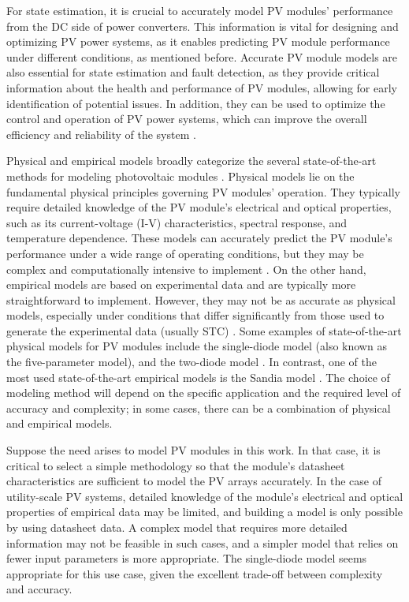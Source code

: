 For state estimation, it is crucial to accurately model PV modules' performance from the DC side of power converters. This information is vital for designing and optimizing PV power systems, as it enables predicting PV module performance under different conditions, as mentioned before. Accurate PV module models are also essential for state estimation and fault detection, as they provide critical information about the health and performance of PV modules, allowing for early identification of potential issues. In addition, they can be used to optimize the control and operation of PV power systems, which can improve the overall efficiency and reliability of the system \cite{Braun2011}.

Physical and empirical models broadly categorize the several state-of-the-art methods for modeling photovoltaic modules \cite{Braun2011}. Physical models lie on the fundamental physical principles governing PV modules' operation. They typically require detailed knowledge of the PV module's electrical and optical properties, such as its current-voltage (I-V) characteristics, spectral response, and temperature dependence. These models can accurately predict the PV module's performance under a wide range of operating conditions, but they may be complex and computationally intensive to implement \cite{Kumar2019}. On the other hand, empirical models are based on experimental data and are typically more straightforward to implement. However, they may not be as accurate as physical models, especially under conditions that differ significantly from those used to generate the experimental data (usually STC) \cite{Braun2011}. Some examples of state-of-the-art physical models for PV modules include the single-diode model (also known as the five-parameter model), and the two-diode model \cite{Godina2017}. In contrast, one of the most used state-of-the-art empirical models is the Sandia model \cite{Braun2011}. The choice of modeling method will depend on the specific application and the required level of accuracy and complexity; in some cases, there can be a combination of physical and empirical models.

Suppose the need arises to model PV modules in this work. In that case, it is critical to select a simple methodology so that the module's datasheet characteristics are sufficient to model the PV arrays accurately. In the case of utility-scale PV systems, detailed knowledge of the module's electrical and optical properties of empirical data may be limited, and building a model is only possible by using datasheet data. A complex model that requires more detailed information may not be feasible in such cases, and a simpler model that relies on fewer input parameters is more appropriate. The single-diode model seems appropriate for this use case, given the excellent trade-off between complexity and accuracy.

